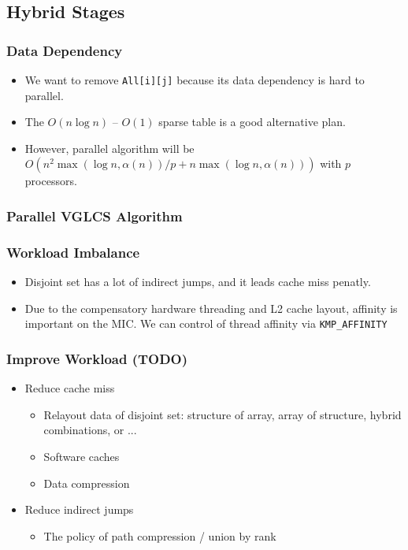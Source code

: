 \subsection{Hybrid Stages}
\begin{frame}
	\frametitle{Data Dependency}
	\begin{itemize}
		\setlength\itemsep{1em}
		\item We want to remove \texttt{All[i][j]} because its data dependency 
			is hard to parallel.
		\item The $O(n \log n)$ -- $O(1)$ sparse table is a good alternative plan. 
		\item However, parallel algorithm will be $O(n^2 \max(\log n, \alpha(n)) / p + n \max(\log n, \alpha(n)))$ 
			with $p$ processors.
	\end{itemize}
\end{frame}

\begin{frame}
	\frametitle{Parallel VGLCS Algorithm}
\end{frame}

\begin{frame}
	\frametitle{Workload Imbalance}
	\begin{itemize}
		\setlength\itemsep{1em}
		\item Disjoint set has a lot of indirect jumps, and it leads cache miss penatly.
		\item Due to the compensatory hardware threading and L2 cache layout, affinity 
			is important on the MIC. We can control of thread affinity via \tt{KMP\_AFFINITY}
	\end{itemize}
\end{frame}

\begin{frame}
	\frametitle{Improve Workload (TODO)}
	\begin{itemize}
		\setlength\itemsep{1em}
		\item Reduce cache miss
			\begin{itemize}
				\setlength\itemsep{1em}
			 	\item Relayout data of disjoint set: structure of array, 
			 		array of structure, hybrid combinations, or ...
			 	\item Software caches
			 	\item Data compression
			\end{itemize}
		\item Reduce indirect jumps
			\begin{itemize}
				\setlength\itemsep{1em}
				\item The policy of path compression / union by rank
			\end{itemize}
	\end{itemize}
\end{frame}


